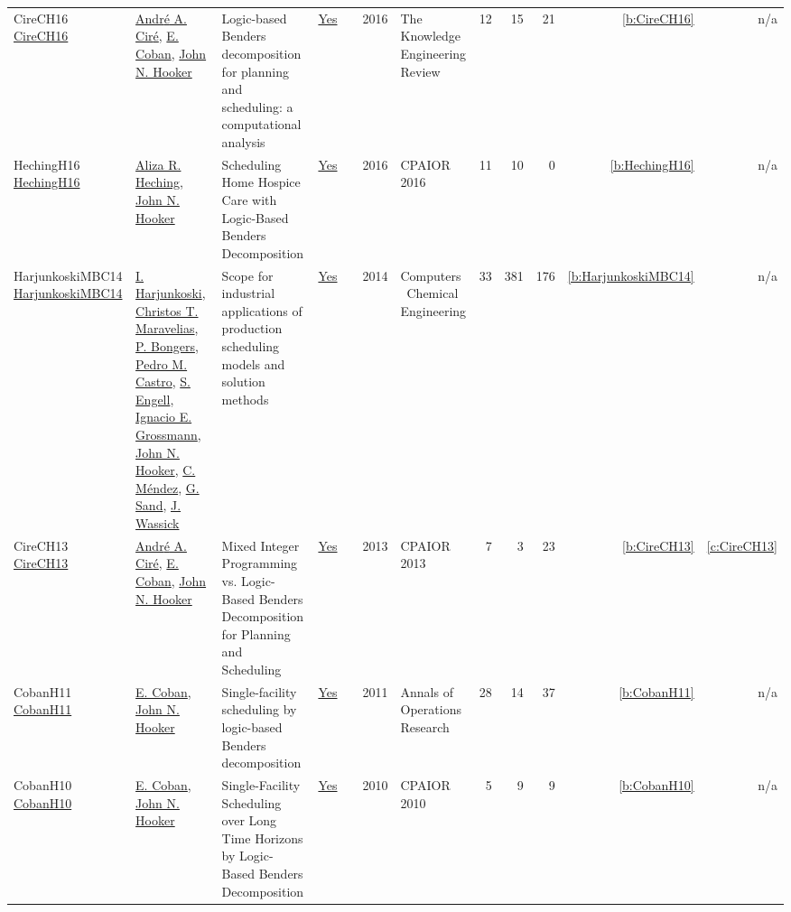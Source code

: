 {\begin{longtable}{>{\raggedright\arraybackslash}p{3cm}>{\raggedright\arraybackslash}p{6cm}>{\raggedright\arraybackslash}p{6.5cm}rrrp{2.5cm}rrrrr}
CireCH16 \href{http://dx.doi.org/10.1017/s0269888916000254}{CireCH16} & \hyperref[auth:a158]{Andr{\'{e}} A. Cir{\'{e}}}, \hyperref[auth:a338]{E. Coban}, \hyperref[auth:a161]{John N. Hooker} & Logic-based Benders decomposition for planning and scheduling: a computational analysis & \href{../works/CireCH16.pdf}{Yes} & \cite{CireCH16} & 2016 & The Knowledge Engineering Review & 12 & 15 & 21 & \ref{b:CireCH16} & n/a\\
HechingH16 \href{https://doi.org/10.1007/978-3-319-33954-2_14}{HechingH16} & \hyperref[auth:a322]{Aliza R. Heching}, \hyperref[auth:a161]{John N. Hooker} & Scheduling Home Hospice Care with Logic-Based Benders Decomposition & \href{../works/HechingH16.pdf}{Yes} & \cite{HechingH16} & 2016 & CPAIOR 2016 & 11 & 10 & 0 & \ref{b:HechingH16} & n/a\\
HarjunkoskiMBC14 \href{http://dx.doi.org/10.1016/j.compchemeng.2013.12.001}{HarjunkoskiMBC14} & \hyperref[auth:a878]{I. Harjunkoski}, \hyperref[auth:a384]{Christos T. Maravelias}, \hyperref[auth:a947]{P. Bongers}, \hyperref[auth:a898]{Pedro M. Castro}, \hyperref[auth:a70]{S. Engell}, \hyperref[auth:a385]{Ignacio E. Grossmann}, \hyperref[auth:a161]{John N. Hooker}, \hyperref[auth:a948]{C. Méndez}, \hyperref[auth:a949]{G. Sand}, \hyperref[auth:a950]{J. Wassick} & Scope for industrial applications of production scheduling models and solution methods & \href{../works/HarjunkoskiMBC14.pdf}{Yes} & \cite{HarjunkoskiMBC14} & 2014 & Computers \  Chemical Engineering & 33 & 381 & 176 & \ref{b:HarjunkoskiMBC14} & n/a\\
CireCH13 \href{https://doi.org/10.1007/978-3-642-38171-3_22}{CireCH13} & \hyperref[auth:a158]{Andr{\'{e}} A. Cir{\'{e}}}, \hyperref[auth:a338]{E. Coban}, \hyperref[auth:a161]{John N. Hooker} & Mixed Integer Programming vs. Logic-Based Benders Decomposition for Planning and Scheduling & \href{../works/CireCH13.pdf}{Yes} & \cite{CireCH13} & 2013 & CPAIOR 2013 & 7 & 3 & 23 & \ref{b:CireCH13} & \ref{c:CireCH13}\\
CobanH11 \href{http://dx.doi.org/10.1007/s10479-011-1031-z}{CobanH11} & \hyperref[auth:a338]{E. Coban}, \hyperref[auth:a161]{John N. Hooker} & Single-facility scheduling by logic-based Benders decomposition & \href{../works/CobanH11.pdf}{Yes} & \cite{CobanH11} & 2011 & Annals of Operations Research & 28 & 14 & 37 & \ref{b:CobanH11} & n/a\\
CobanH10 \href{https://doi.org/10.1007/978-3-642-13520-0_11}{CobanH10} & \hyperref[auth:a338]{E. Coban}, \hyperref[auth:a161]{John N. Hooker} & Single-Facility Scheduling over Long Time Horizons by Logic-Based Benders Decomposition & \href{../works/CobanH10.pdf}{Yes} & \cite{CobanH10} & 2010 & CPAIOR 2010 & 5 & 9 & 9 & \ref{b:CobanH10} & n/a\\

\end{longtable}}
